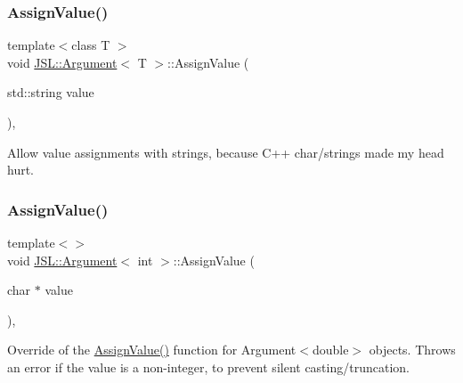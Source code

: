 \mbox{\label{classJSL_1_1Argument_af0c053ad614c0f20c48cf31389eee7e9}} 
\subsubsection{\texorpdfstring{Assign\+Value()}{AssignValue()}\hspace{0.1cm}{\footnotesize\ttfamily [2/6]}}
{\footnotesize\ttfamily template$<$class T $>$ \\
void \hyperlink{classJSL_1_1Argument}{J\+S\+L\+::\+Argument}$<$ T $>$\+::Assign\+Value (\begin{DoxyParamCaption}\item[{std\+::string}]{value }\end{DoxyParamCaption})\hspace{0.3cm}{\ttfamily [inline]}, {\ttfamily [private]}}



Allow value assignments with strings, because C++ char/strings made my head hurt. 

\mbox{\label{classJSL_1_1Argument_a2b60a11be4f0ba28dfb3395c49ced06b}} 
\subsubsection{\texorpdfstring{Assign\+Value()}{AssignValue()}\hspace{0.1cm}{\footnotesize\ttfamily [3/6]}}
{\footnotesize\ttfamily template$<$$>$ \\
void \hyperlink{classJSL_1_1Argument}{J\+S\+L\+::\+Argument}$<$ int $>$\+::Assign\+Value (\begin{DoxyParamCaption}\item[{char $\ast$}]{value }\end{DoxyParamCaption})\hspace{0.3cm}{\ttfamily [inline]}, {\ttfamily [private]}}



Override of the \hyperlink{classJSL_1_1Argument_abc43696d406a6d369cd1b3d8cb1540b5}{Assign\+Value()} function for Argument$<$double$>$ objects. Throws an error if the value is a non-\/integer, to prevent silent casting/truncation. 


